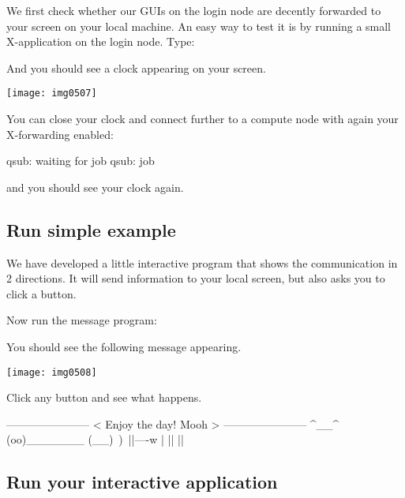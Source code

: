 We first check whether our GUIs on the login node are decently forwarded to
your screen on your local machine. An easy way to test it is by running a small
X-application on the login node. Type:

\begin{prompt}
\end{prompt}

And you should see a clock appearing on your screen.

\texttt{[image: img0507]}

You can close your clock and connect further to a compute node with again your
X-forwarding enabled:

\begin{prompt}
qsub: waiting for job %
qsub: job %
\end{prompt}

and you should see your clock again.
\fi

\subsection{Run simple example}

We have developed a little interactive program that shows the communication in
2 directions. It will send information to your local screen, but also asks you
to click a button.

Now run the message program:
\begin{prompt}
\end{prompt}

You should see the following message appearing.

\texttt{[image: img0508]}

Click any button and see what happens.

\begin{prompt}
-----------------------
< Enjoy the day! Mooh > 
----------------------- 
     ^__^ 
     (oo)\_______ 
     (__)\       )\/\ 
         ||----w | 
         ||     ||

\end{prompt}

\subsection{Run your interactive application}

